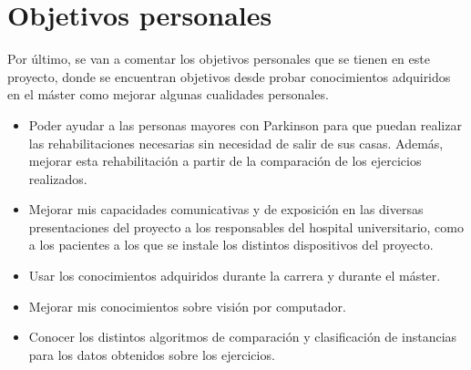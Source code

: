\section{Objetivos personales}
Por último, se van a comentar los objetivos personales que se tienen en este proyecto, donde se encuentran objetivos desde probar conocimientos adquiridos en el máster como mejorar algunas cualidades personales.
\begin{itemize}
	\item Poder ayudar a las personas mayores con Parkinson para que puedan realizar las rehabilitaciones necesarias sin necesidad de salir de sus casas. Además, mejorar esta rehabilitación a partir de la comparación de los ejercicios realizados.
	\item Mejorar mis capacidades comunicativas y de exposición en las diversas presentaciones del proyecto a los responsables del hospital universitario, como a los pacientes a los que se instale los distintos dispositivos del proyecto.
	\item Usar los conocimientos adquiridos durante la carrera y durante el máster.
	\item Mejorar mis conocimientos sobre visión por computador.
	\item Conocer los distintos algoritmos de comparación y clasificación de instancias para los datos obtenidos sobre los ejercicios.
\end{itemize} 

